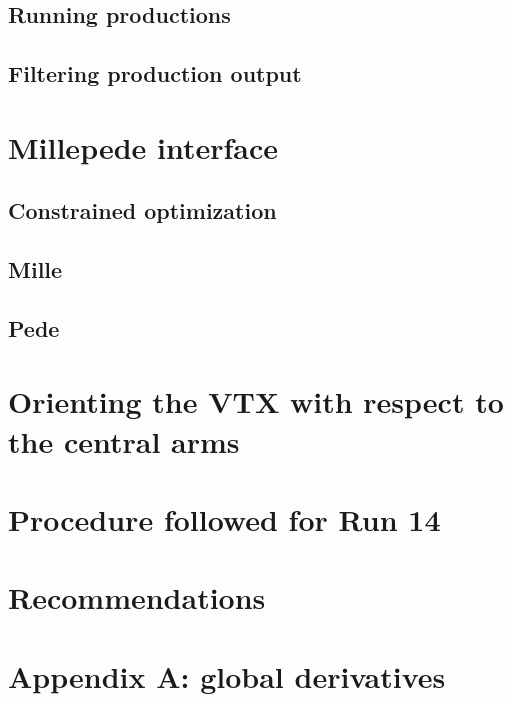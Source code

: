 \documentclass[12pt]{article}
\begin{document}
\subsection{Running productions}
\subsection{Filtering production output}
\section{Millepede interface}
\subsection{Constrained optimization}
\subsection{Mille}
\subsection{Pede}
\section{Orienting the VTX with respect to the central arms}
\section{Procedure followed for Run 14}
\section{Recommendations}
\section{Appendix A: global derivatives}
\end{document}
